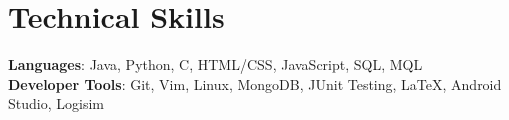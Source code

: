 \documentclass[letterpaper,11pt]{article}
\begin{document}
\section{Technical Skills}
 \begin{itemize}[leftmargin=0.15in, label={}]
    \small{\item{
     \textbf{Languages}{: Java, Python, C, HTML/CSS, JavaScript, SQL, MQL} \\
     \textbf{Developer Tools}{: Git, Vim, Linux, MongoDB, JUnit Testing, LaTeX, Android Studio, Logisim} \\
    }}
 \end{itemize}


\end{document}
